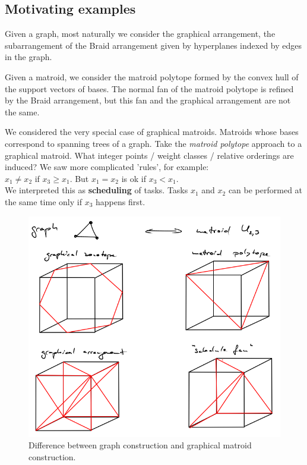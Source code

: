 \documentclass[11pt,letter]{amsart}
\begin{document}
\subsection{Motivating examples}

Given a graph, most naturally we consider the graphical arrangement,
the subarrangement of the Braid arrangement given by hyperplanes
indexed by edges in the graph.

Given a matroid, we consider the matroid polytope formed by the convex
hull of the support vectors of bases.  The normal fan of the matroid
polytope is refined by the Braid arrangement, but this fan and the
graphical arrangement are not the same.  

We considered the very special case of graphical matroids.  Matroids
whose bases correspond to spanning trees of a graph.  Take the
\emph{matroid polytope} approach to a graphical matroid.  What integer
points / weight classes / relative orderings are induced?  We saw more
complicated 'rules', for example:\\

$x_1 \neq x_2$ if $x_3 \geq x_1$.  But $x_1 = x_2$ is ok if $x_3 < x_1$.\\

We interpreted this as {\bf{scheduling}} of tasks.  Tasks $x_1$ and
$x_2$ can be performed  at the same time only if $x_3$ happens first.

\begin{figure}[h]
\includegraphics[width=13cm]{graph-matroid}
\caption{Difference between graph construction and graphical matroid construction.}
\end{figure}
\end{document}

